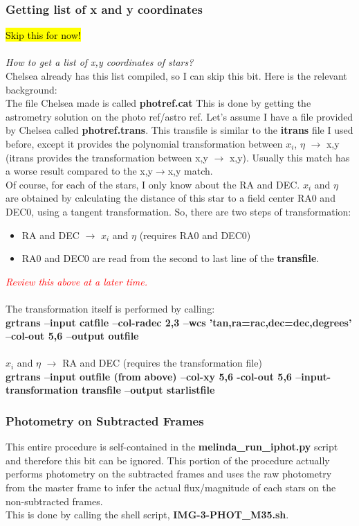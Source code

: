 \documentclass[11pt,letterpaper]{book} %
\begin{document}
\subsubsection*{Getting list of x and y coordinates} 
\hl{Skip this for now!}\\ \\
\textit{How to get a list of x,y coordinates of stars?}\\
Chelsea already has this list compiled, so I can skip this bit. Here is the relevant background: \\
The file Chelsea made is called \textbf{photref.cat}
This is done by getting the astrometry solution on the photo ref/astro ref. 
Let's assume I have a file provided by Chelsea called \textbf{photref.trans}. 
This transfile is similar to the \textbf{itrans} file I used before, 
except it provides the polynomial transformation between 
$x_{i}$, $\eta$ $\rightarrow$ x,y (itrans provides the transformation between x,y $\rightarrow$ x,y). 
Usually this match has a worse result compared to the x,y$\rightarrow$x,y match.\\ 
Of course, for each of the stars, I only know about the RA and DEC.
$x_{i}$ and $\eta$ are obtained by calculating the distance of this star to a 
field center RA0 and DEC0, using a tangent transformation. 
So, there are two steps of transformation:
\begin{itemize}
\item RA and DEC $\rightarrow$  $x_{i}$ and $\eta$ (requires RA0 and DEC0) 
\item RA0 and DEC0 are read from the second to last line of the \textbf{transfile}.
\end{itemize}
\textcolor{red}{\textit{Review this above at a later time.}}\\ \\ 
The transformation itself is performed by calling: \\
\textbf{grtrans --input catfile --col-radec 2,3 --wcs 'tan,ra=rac,dec=dec,degrees' --col-out 5,6 --output outfile}\\ \\
$x_{i}$ and $\eta$ $\rightarrow$ RA and DEC (requires the transformation file)\\
\textbf{grtrans --input outfile (from above) --col-xy 5,6 -col-out 5,6 --input-transformation transfile --output starlistfile}

\subsubsection*{Photometry on Subtracted Frames}
This entire procedure is self-contained in the \textbf{melinda\_run\_iphot.py} script and therefore this bit can be ignored. 
This portion of the procedure actually performs photometry on the subtracted frames and uses the raw photometry from the master frame to infer the actual flux/magnitude of each stars on the non-subtracted frames. \\
This is done by calling the shell script, \textbf{IMG-3-PHOT\_M35.sh}.
\end{document}
